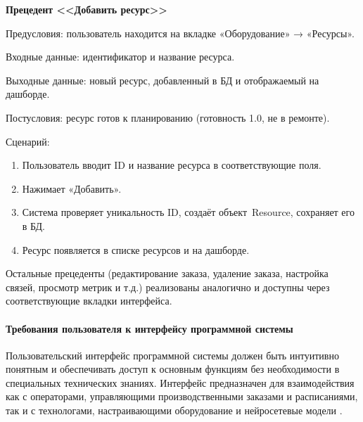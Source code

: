 \textbf{Прецедент <<Добавить ресурс>>}

Предусловия: пользователь находится на вкладке «Оборудование» → «Ресурсы».

Входные данные: идентификатор и название ресурса.

Выходные данные: новый ресурс, добавленный в БД и отображаемый на дашборде.

Постусловия: ресурс готов к планированию (готовность 1.0, не в ремонте).

Сценарий:

\begin{enumerate}
\item Пользователь вводит ID и название ресурса в соответствующие поля.
\item Нажимает «Добавить».
\item Система проверяет уникальность ID, создаёт объект Resource, сохраняет его в БД.
\item Ресурс появляется в списке ресурсов и на дашборде.
\end{enumerate}

Остальные прецеденты (редактирование заказа, удаление заказа, настройка связей, просмотр метрик и т.д.) реализованы аналогично и доступны через соответствующие вкладки интерфейса.

\paragraph{Требования пользователя к интерфейсу программной системы}

Пользовательский интерфейс программной системы должен быть интуитивно понятным и обеспечивать доступ к основным функциям без необходимости в специальных технических знаниях. Интерфейс предназначен для взаимодействия как с операторами, управляющими производственными заказами и расписаниями, так и с технологами, настраивающими оборудование и нейросетевые модели \cite{interface}.

